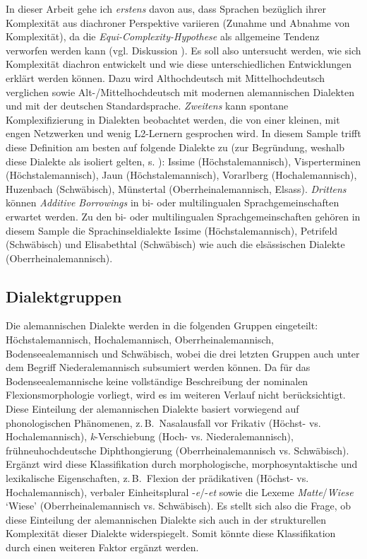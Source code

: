 In dieser Arbeit gehe ich \textit{erstens} davon aus, dass Sprachen bezüglich ihrer Komplexität aus diachroner Perspektive variieren (Zunahme und Abnahme von Komplexität), da die \textit{Equi-Com\-ple\-xi\-ty-Hy\-po\-the\-se} als allgemeine Tendenz verworfen werden kann (vgl. Diskussion ). Es soll also untersucht werden, wie sich Komplexität diachron entwickelt und wie diese unterschiedlichen Entwicklungen erklärt werden können. Dazu wird Althochdeutsch mit Mittelhochdeutsch verglichen sowie Alt-/Mittelhochdeutsch mit modernen alemannischen Dialekten und mit der deutschen Standardsprache. \textit{Zweitens} kann spontane Komplexifizierung in Dialekten beobachtet werden, die von einer kleinen,  mit engen Netzwerken und wenig L2-Ler\-nern gesprochen wird. In diesem Sample trifft diese Definition am besten auf folgende Dialekte zu (zur Begründung, weshalb diese Dialekte als isoliert gelten, s. ): Issime (Höchstalemannisch), Visperterminen (Höchstalemannisch), Jaun (Höchstalemannisch), Vorarlberg (Hochalemannisch), Huzenbach (Schwäbisch), Münstertal (Oberrheinalemannisch, Elsass). \textit{Drittens} können \textit{Additive Borrowings} in bi- oder multilingualen Sprachgemeinschaften erwartet werden. Zu den bi- oder multilingualen Sprachgemeinschaften gehören in diesem Sample die Sprachinseldialekte Issime (Höchstalemannisch), Petrifeld (Schwäbisch) und Elisabethtal (Schwäbisch) wie auch die elsässischen Dialekte (Oberrheinalemannisch).

\subsection{Dialektgruppen}\label{3.2.2}

Die alemannischen Dialekte werden in die folgenden Gruppen eingeteilt: Höchstalemannisch, Hochalemannisch, Oberrheinalemannisch, Bodenseealemannisch und Schwäbisch, wobei die drei letzten Gruppen auch unter dem Begriff Niederalemannisch subsumiert werden können. Da für das Bodenseealemannische keine vollständige Beschreibung der nominalen Flexionsmorphologie vorliegt, wird es im weiteren Verlauf nicht berücksichtigt. Diese Einteilung der alemannischen Dialekte basiert vorwiegend auf phonologischen Phänomenen, z.\,B.\ Nasalausfall vor Frikativ (Höchst- vs. Hochalemannisch), \textit{k}{}-Verschiebung (Hoch- vs. Niederalemannisch), frühneuhochdeutsche Diphthongierung (Oberrheinalemannisch vs. Schwäbisch). Ergänzt wird diese Klassifikation durch morphologische, morphosyntaktische und lexikalische Eigenschaften, z.\,B.\ Flexion der prädikativen  (Höchst- vs. Hochalemannisch), verbaler Einheitsplural -\textit{e}/-\textit{et} sowie die Lexeme \textit{Matte}/\textit{Wiese} ‘Wiese’ (Oberrheinalemannisch vs. Schwäbisch). Es stellt sich also die Frage, ob diese Einteilung der alemannischen Dialekte sich auch in der strukturellen Komplexität dieser Dialekte widerspiegelt. Somit könnte diese Klassifikation durch einen weiteren Faktor ergänzt werden.

